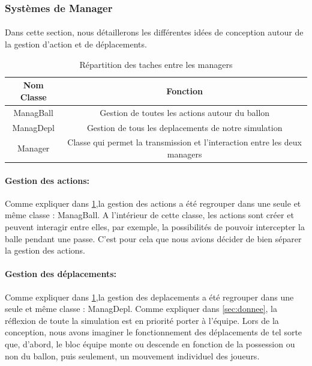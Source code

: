 \subsubsection{Systèmes de Manager}
\label{sec:managers}

\paragraph{}
    Dans cette section, nous détaillerons les différentes idées de conception autour de la gestion d'action et de déplacements.

\begin{table}[h!]
    \centering
    \begin{tabular}{|c|c|}
    \hline
    Nom Classe & Fonction\\
    \hline
    ManagBall & Gestion de toutes les actions autour du ballon\\
    \hline
    ManagDepl & Gestion de tous les deplacements de notre simulation\\
    \hline
    Manager & Classe qui permet la transmission et l'interaction entre les deux managers\\
    \hline
    \end{tabular}
    \caption{Répartition des taches entre les managers}
    \label{tab:managers}
\end{table}

\paragraph{Gestion des actions: }
    Comme expliquer dans \ref{tab:managers},la gestion des actions a été regrouper dans une seule et même classe : ManagBall. A l'intérieur de cette classe, les actions sont créer et peuvent interagir entre elles, par exemple, la possibilités de pouvoir intercepter la balle pendant une passe. C'est pour cela que nous avions décider de bien séparer la gestion des actions.

\paragraph{Gestion des déplacements: }
    Comme expliquer dans \ref{tab:managers},la gestion des deplacements a été regrouper dans une seule et même classe : ManagDepl. Comme expliquer dans \ref{sec:donnee}, la réflexion de toute la simulation est en priorité porter à l'équipe. Lors de la conception, nous avons imaginer le fonctionnement des déplacements de tel sorte que, d'abord, le bloc équipe monte ou descende en fonction de la possession ou non du ballon, puis seulement, un mouvement individuel des joueurs.
\newpage

